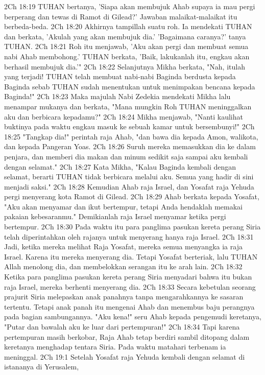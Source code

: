 2Ch 18:19  TUHAN bertanya, 'Siapa akan membujuk Ahab supaya ia mau pergi berperang dan tewas di Ramot di Gilead?' Jawaban malaikat-malaikat itu berbeda-beda.
2Ch 18:20  Akhirnya tampillah suatu roh. Ia mendekati TUHAN dan berkata, 'Akulah yang akan membujuk dia.' 'Bagaimana caranya?' tanya TUHAN.
2Ch 18:21  Roh itu menjawab, 'Aku akan pergi dan membuat semua nabi Ahab membohong.' TUHAN berkata, 'Baik, lakukanlah itu, engkau akan berhasil membujuk dia.'"
2Ch 18:22  Selanjutnya Mikha berkata, "Nah, itulah yang terjadi! TUHAN telah membuat nabi-nabi Baginda berdusta kepada Baginda sebab TUHAN sudah menentukan untuk menimpakan bencana kepada Baginda!"
2Ch 18:23  Maka majulah Nabi Zedekia mendekati Mikha lalu menampar mukanya dan berkata, "Mana mungkin Roh TUHAN meninggalkan aku dan berbicara kepadamu?"
2Ch 18:24  Mikha menjawab, "Nanti kaulihat buktinya pada waktu engkau masuk ke sebuah kamar untuk bersembunyi!"
2Ch 18:25  "Tangkap dia!" perintah raja Ahab, "dan bawa dia kepada Amon, walikota, dan kepada Pangeran Yoas.
2Ch 18:26  Suruh mereka memasukkan dia ke dalam penjara, dan memberi dia makan dan minum sedikit saja sampai aku kembali dengan selamat."
2Ch 18:27  Kata Mikha, "Kalau Baginda kembali dengan selamat, berarti TUHAN tidak berbicara melalui aku. Semua yang hadir di sini menjadi saksi."
2Ch 18:28  Kemudian Ahab raja Israel, dan Yosafat raja Yehuda pergi menyerang kota Ramot di Gilead.
2Ch 18:29  Ahab berkata kepada Yosafat, "Aku akan menyamar dan ikut bertempur, tetapi Anda hendaklah memakai pakaian kebesaranmu." Demikianlah raja Israel menyamar ketika pergi bertempur.
2Ch 18:30  Pada waktu itu para panglima pasukan kereta perang Siria telah diperintahkan oleh rajanya untuk menyerang hanya raja Israel.
2Ch 18:31  Jadi, ketika mereka melihat Raja Yosafat, mereka semua menyangka ia raja Israel. Karena itu mereka menyerang dia. Tetapi Yosafat berteriak, lalu TUHAN Allah menolong dia, dan membelokkan serangan itu ke arah lain.
2Ch 18:32  Ketika para panglima pasukan kereta perang Siria menyadari bahwa itu bukan raja Israel, mereka berhenti menyerang dia.
2Ch 18:33  Secara kebetulan seorang prajurit Siria melepaskan anak panahnya tanpa mengarahkannya ke sasaran tertentu. Tetapi anak panah itu mengenai Ahab dan menembus baju perangnya pada bagian sambungannya. "Aku kena!" seru Ahab kepada pengemudi keretanya, "Putar dan bawalah aku ke luar dari pertempuran!"
2Ch 18:34  Tapi karena pertempuran masih berkobar, Raja Ahab tetap berdiri sambil ditopang dalam keretanya menghadap tentara Siria. Pada waktu matahari terbenam ia meninggal.
2Ch 19:1  Setelah Yosafat raja Yehuda kembali dengan selamat di istananya di Yerusalem,
